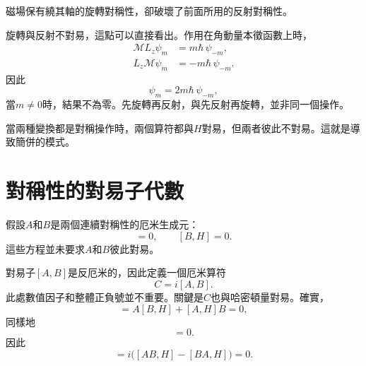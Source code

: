 \begin{classroomqa}
\end{classroomqa}

磁場保有繞其軸的旋轉對稱性，卻破壞了前面所用的反射對稱性。

\begin{classroomqa}
\end{classroomqa}

旋轉與反射不對易，這點可以直接看出。作用在角動量本徵函數上時，
\begin{align}
\mathcal M L_z\psi_m
&=m\hbar\,\psi_{-m},\\
L_z\mathcal M\psi_m
&=-m\hbar\,\psi_{-m}.
\end{align}
因此
\begin{equation}
[\mathcal M,L_z]\psi_m
=2m\hbar\,\psi_{-m},
\end{equation}
當\(m\neq0\)時，結果不為零。先旋轉再反射，與先反射再旋轉，並非同一個操作。

當兩種變換都是對稱操作時，兩個算符都與\(H\)對易，但兩者彼此不對易。這就是導致簡併的模式。

\begin{classroomqa}
\end{classroomqa}

\section{對稱性的對易子代數}

假設\(A\)和\(B\)是兩個連續對稱性的厄米生成元：
\begin{equation}
[A,H]=0,
\qquad
[B,H]=0.
\end{equation}
這些方程並未要求\(A\)和\(B\)彼此對易。

對易子\([A,B]\)是反厄米的，因此定義一個厄米算符
\begin{equation}
C=i[A,B].
\end{equation}
此處數值因子和整體正負號並不重要。關鍵是\(C\)也與哈密頓量對易。確實，
\begin{equation}
[AB,H]
=A[B,H]+[A,H]B=0,
\end{equation}
同樣地
\begin{equation}
[BA,H]=0.
\end{equation}
因此
\begin{equation}
[C,H]
=i\bigl([AB,H]-[BA,H]\bigr)=0.
\end{equation}

